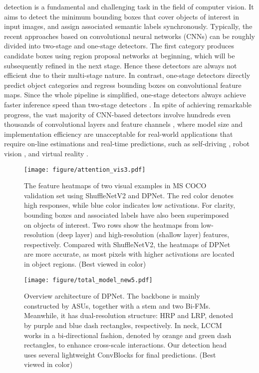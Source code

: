 \documentclass[lettersize,journal]{IEEEtran}
\begin{document}
 detection is a fundamental and challenging task in the field of computer vision. It aims to detect the minimum bounding boxes that cover objects of interest in input images, and assign associated semantic labels synchronously. Typically, the recent approaches based on convolutional neural networks (CNNs) can be roughly divided into two-stage \cite{fasterrcnn,he2017mask} and one-stage \cite{redmon2016you,liu2016ssd,redmon2018yolov3} detectors. The first category produces candidate boxes using region proposal networks at beginning, which will be subsequently refined in the next stage. Hence these detectors are always not efficient due to their multi-stage nature. In contrast, one-stage detectors \cite{redmon2016you,liu2016ssd,redmon2018yolov3} directly predict object categories and regress bounding boxes on convolutional feature maps. Since the whole pipeline is simplified, one-stage detectors always achieve faster inference speed than two-stage detectors \cite{fasterrcnn,he2017mask}. In spite of achieving remarkable progress, the vast majority of CNN-based detectors involve hundreds even thousands of convolutional layers and feature channels \cite{resnet,vgg}, where model size and implementation efficiency are unacceptable for real-world applications that require on-line estimations and real-time predictions, such as self-driving \cite{geiger2012we}, robot vision \cite{o2018evaluating}, and virtual reality \cite{liu2019edge}. 
\begin{figure}[t] 
\centering 
\texttt{[image: figure/attention\_vis3.pdf]} 
\caption{The feature heatmaps of two visual examples in MS COCO \cite{lin2014microsoft} validation set using ShuffleNetV2\cite{ma2018shufflenet} and DPNet. The red color denotes high responses, while blue color indicates low activations. For clarity, bounding boxes and associated labels have also been superimposed on objects of interest. Two rows show the heatmaps from low-resolution (deep layer) and high-resolution (shallow layer) features, respectively. Compared with ShuffleNetV2\cite{ma2018shufflenet}, the heatmaps of DPNet are more accurate, as most pixels with higher activations are located in object regions. (Best viewed in color)} 
\label{Fig:vis} 
\end{figure}

\begin{figure*}[ht] 
\centering 
\texttt{[image: figure/total\_model\_new5.pdf]} 
\caption{Overview architecture of DPNet. The backbone is mainly constructed by ASUs, together with a stem and two Bi-FMs. Meanwhile, it has dual-resolution structure: HRP and LRP, denoted by purple and blue dash rectangles, respectively. In neck, LCCM works in a bi-directional fashion, denoted by orange and green dash rectangles, to enhance cross-scale interactions. Our detection head uses several lightweight ConvBlocks for final predictions. (Best viewed in color)} 
\label{Fig:network} 
\end{figure*}
\end{document}
